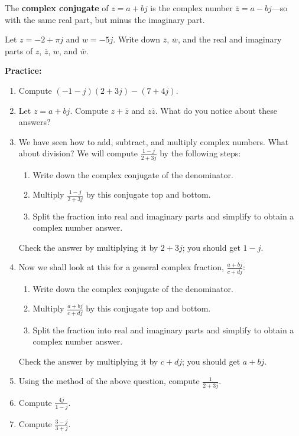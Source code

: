 \documentclass{article}
\begin{document}
The \textbf{complex conjugate} of $z=a+bj$ is the complex number $\bar{z}=a-bj$---so with the same real part, but minus the imaginary part.

Let  $z=-2+\pi j$ and $w=-5j$. Write down $\bar{z}$, $\bar{w}$, and the real and imaginary parts of $z$, $\bar{z}$, $w$, and $\bar{w}$.

\vfill





\clearpage


\textbf{Practice:}

\vspace{5mm}

\begin{enumerate}
\item Compute $(-1-j)(2+3j)-(7+4j)$.
\item Let $z=a+bj$. Compute $z+\bar{z}$ and $z\bar{z}$. What do you notice about these answers?
\item We have seen how to add, subtract, and multiply complex numbers. What about division? We will compute $\frac{1-j}{2+3j}$ by the following steps:
	\begin{enumerate}
	\item Write down the complex conjugate of the denominator.
	\item Multiply $\frac{1-j}{2+3j}$ by this conjugate top and bottom.
	\item Split the fraction into real and imaginary parts and simplify to obtain a complex number answer.
	\end{enumerate}
	Check the answer by multiplying it by $2+3j$; you should get $1-j$.
\item Now we shall look at this for a general complex fraction, $\frac{a+bj}{c+dj}$:
	\begin{enumerate}
	\item Write down the complex conjugate of the denominator.
	\item Multiply $\frac{a+bj}{c+dj}$ by this conjugate top and bottom.
	\item Split the fraction into real and imaginary parts and simplify to obtain a complex number answer.
	\end{enumerate}
	Check the answer by multiplying it by $c+dj$; you should get $a+bj$.
\item Using the method of the above question, compute $\frac{1}{2+3j}$.
\item Compute $\frac{4j}{1-j}$.
\item Compute $\frac{3-j}{3+j}$.
\end{enumerate}
\end{document}

